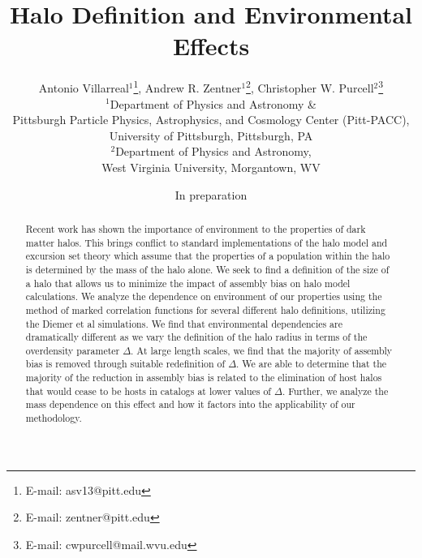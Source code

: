 \documentclass[usenatbib,usegraphicx,letterpaper]{mn2e}
\begin{document}
\title[Halo Environmental Effects as a Function of Halo Definition]{Halo Definition and Environmental Effects}
\author[Antonio Villarreal, Andrew R. Zentner, Christopher W. Purcell]
{Antonio Villarreal$^1$\thanks{E-mail: asv13@pitt.edu},
 Andrew R. Zentner$^1$\thanks{E-mail: zentner@pitt.edu}, 
 Christopher W. Purcell$^2$\thanks{E-mail: cwpurcell@mail.wvu.edu}\\
$^{1}$Department of Physics and Astronomy \& \\
Pittsburgh Particle Physics, Astrophysics, and Cosmology Center (Pitt-PACC),\\ 
University of Pittsburgh, Pittsburgh, PA\\
$^{2}$Department of Physics and Astronomy, \\
West Virginia University, Morgantown, WV}

\date{In preparation}



\maketitle

\begin{abstract}
Recent work has shown the importance of environment to the properties of dark matter halos. This brings conflict to standard implementations of the halo model and excursion set theory which assume that the properties of a population within the halo is determined by the mass of the halo alone. We seek to find a definition of the size of a halo that allows us to minimize the impact of assembly bias on halo model calculations. We analyze the dependence on environment of our properties using the method of marked correlation functions for several different halo definitions, utilizing the Diemer et al simulations. We find that environmental dependencies are dramatically different as we vary the definition of the halo radius in terms of the overdensity parameter $\Delta$. At large length scales, we find that the majority of assembly bias is removed through suitable redefinition of $\Delta$. We are able to determine that the majority of the reduction in assembly bias is related to the elimination of host halos that would cease to be hosts in catalogs at lower values of $\Delta$. Further, we analyze the mass dependence on this effect and how it factors into the applicability of our methodology.
\end{abstract}
\end{document}
